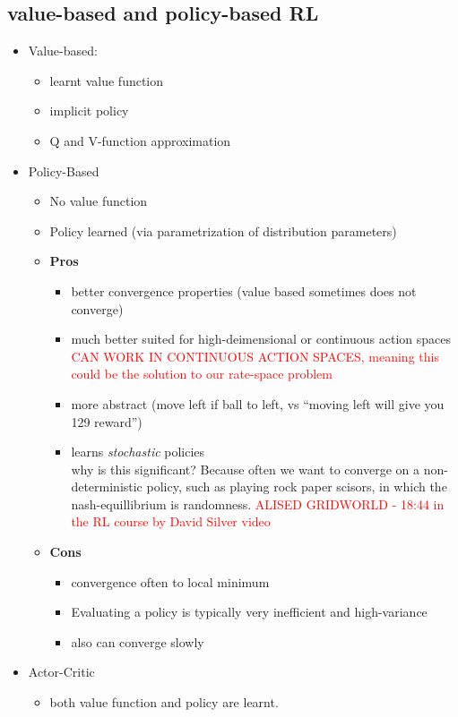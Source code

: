 \documentclass[11pt]{article}
\newcommand\later[1]{\textcolor{red}{#1}}
\begin{document}
\subsection{value-based and policy-based RL}
\begin{itemize}
  \item Value-based:
    \begin{itemize}
    \item learnt value function
    \item implicit policy
    \item Q and V-function approximation
    \end{itemize}
  \item Policy-Based
    \begin{itemize}
    \item No value function
    \item Policy learned (via parametrization of distribution parameters)
    \item \textbf{Pros}
      \begin{itemize}
      \item better convergence properties (value based sometimes does not converge)
      \item much better suited for high-deimensional or continuous action spaces \later{CAN WORK IN CONTINUOUS
          ACTION SPACES, meaning this could be the solution to our rate-space problem}
      \item more abstract (move left if ball to left, vs ``moving left will give you 129 reward'')
      \item learns \textit{stochastic} policies\\
        why is this significant? Because often we want to converge on a non-deterministic policy, such as playing
        rock paper scisors, in which the nash-equillibrium is randomness.
        \later{ALISED GRIDWORLD - 18:44 in the RL course by David Silver video}

      \end{itemize}
    \item \textbf{Cons}
      \begin{itemize}
      \item convergence often to local minimum
      \item Evaluating a policy is typically very inefficient and high-variance
        \item also can converge slowly
      \end{itemize}
    \end{itemize}
  \item Actor-Critic
    \begin{itemize}
    \item both value function and policy are learnt.
    \end{itemize}
      
  \end{itemize}
\end{document}
